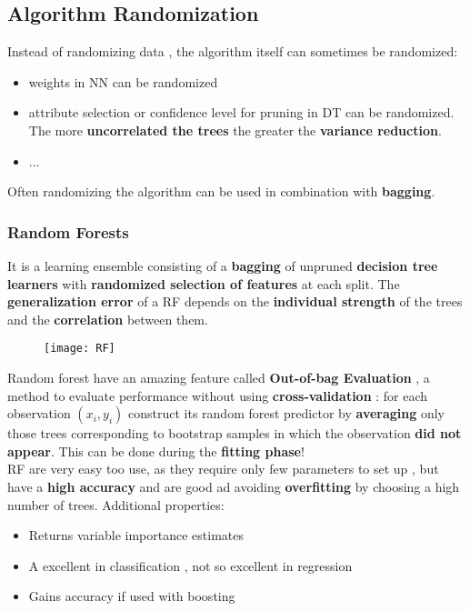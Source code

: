 \subsection{Algorithm Randomization}
Instead of randomizing data , the algorithm itself can sometimes be randomized: 
\begin{itemize}
\item weights in NN can be randomized
\item attribute selection or confidence level for pruning in DT can be randomized. The more \textbf{uncorrelated the trees} the greater the \textbf{variance reduction}.
\item ...
\end{itemize}
Often randomizing the algorithm can be used in combination with \textbf{bagging}. 

\subsubsection{Random Forests}
It is a learning ensemble consisting of a \textbf{bagging}  of unpruned \textbf{decision tree learners} with \textbf{randomized selection of features} at each split. The \textbf{generalization error} of a RF depends on the \textbf{individual strength} of the trees and the \textbf{correlation} between them.
\begin{figure}[H]
  \centering
  \texttt{[image: RF]}
\end{figure}
Random forest have an amazing feature called \textbf{Out-of-bag Evaluation} , a method to evaluate performance without using \textbf{cross-validation} :
for each observation $(x_i,y_i)$ construct its random forest predictor by \textbf{averaging} only those trees corresponding to bootstrap samples in which the observation \textbf{did not appear}. This can be done during the \textbf{fitting phase}!\\
RF are very easy too use, as they require only few parameters to set up , but have a \textbf{high accuracy} and are good ad avoiding \textbf{overfitting} by choosing a high number of trees. Additional properties:
\begin{itemize}
\item Returns variable importance estimates
\item A excellent in classification , not so excellent in regression
\item Gains accuracy if used with boosting 
\end{itemize}

